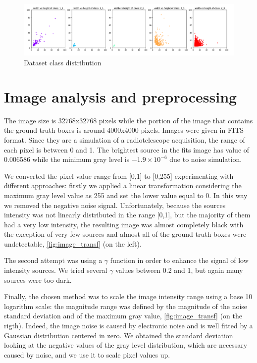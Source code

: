 \documentclass[a4paper,10pt]{report}
\begin{document}
\begin{figure}[h]
  \center
  \includegraphics[width=0.85\linewidth]{scatter_class.png}
  \caption{Dataset class distribution}
  \label{fig:scatter_class}
\end{figure}

\section{Image analysis and preprocessing}
The image size is 32768x32768 pixels while the portion of the image that contains the ground truth boxes is around 4000x4000 pixels.
Images were given in FITS format. Since they are a simulation of a radiotelescope acquisition, the range of each pixel is between 0 and 1.
The brightest source in the fits image has value of 0.006586 while the minimum gray level is  $-1.9 \times 10^{-6}$ due to noise simulation.

We converted the pixel value range from [0,1] to [0,255] experimenting with different approaches: firstly we applied a linear transformation considering the maximum gray level value as 255 and set the lower value equal to 0. 
In this way we removed the negative noise signal. 
Unfortunately, because the sources intensity was not linearly distributed in the range [0,1], but the majority of them had a very low intensity, the resulting image was almost completely black with the exception of very few sources and almost all of the ground truth boxes were undetectable, \ref{fig:image_transf} (on the left).

The second attempt was using a $\gamma$ function in order to enhance the signal of low intensity sources. We tried several $\gamma$ values between 0.2 and 1, but again many sources were too dark.

Finally, the chosen method was to scale the image intensity range using a base 10 logarithm scale: the magnitude range was defined by the magnitude of the noise standard deviation and of the maximum gray value, \ref{fig:image_transf} (on the rigth). Indeed, the image noise is caused by electronic noise and is well fitted by a Gaussian distribution centered in zero. We obtained the standard deviation looking at the negative values of the gray level distribution, which are necessary caused by noise, and we use it to scale pixel values up.
\end{document}
